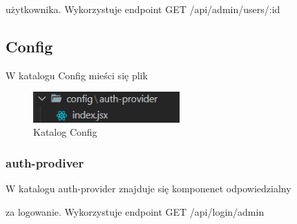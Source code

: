 \documentclass[titlepage]{article}
\begin{document}
\newline
użytkownika.
Wykorzystuje endpoint GET /api/admin/users/:id


\subsection{Config}
W katalogu Config mieści się plik

\begin{figure}[h]
\centering
\includegraphics[width=0.5\textwidth]{config-admin.png}

\caption{Katalog Config}
\label{fig:obrazek Config}
\end{figure}

\subsubsection{auth-prodiver}
W katalogu auth-provider znajduje się komponenet odpowiedzialny

\newline
za logowanie.
Wykorzystuje endpoint GET /api/login/admin
\end{document}
